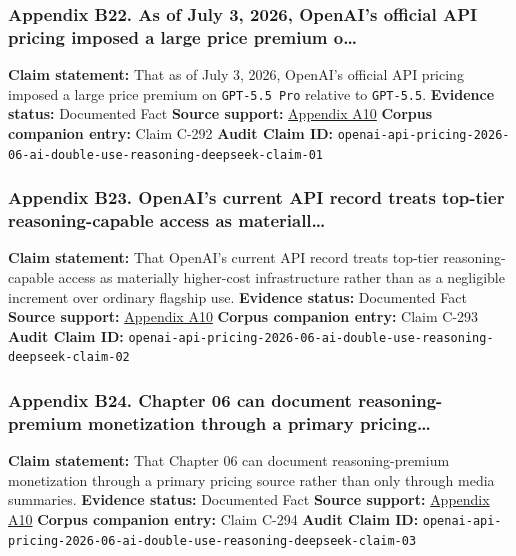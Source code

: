 \documentclass[
  american,
  11pt,
  letterpaper,
]{article}
\begin{document}
\subsubsection{Appendix B22. As of July 3, 2026, OpenAI's official API
pricing imposed a large price premium
o\ldots{}}\label{appendix-b22-as-of-july-3-2026-openai-s-official-api-pricing-imposed-a-large-price-premium-o}

\textbf{Claim statement:} That as of July 3, 2026, OpenAI's official API
pricing imposed a large price premium on \texttt{GPT-5.5\ Pro} relative
to \texttt{GPT-5.5}. \textbf{Evidence status:} Documented Fact
\textbf{Source support:}
\hyperref[appendix-a10-pricing-openai-api]{Appendix A10} \textbf{Corpus
companion entry:} Claim C-292 \textbf{Audit Claim ID:}
\texttt{openai-api-pricing-2026-06-ai-double-use-reasoning-deepseek-claim-01}

\subsubsection{Appendix B23. OpenAI's current API record treats top-tier
reasoning-capable access as
materiall\ldots{}}\label{appendix-b23-openai-s-current-api-record-treats-top-tier-reasoning-capable-access-as-materiall}

\textbf{Claim statement:} That OpenAI's current API record treats
top-tier reasoning-capable access as materially higher-cost
infrastructure rather than as a negligible increment over ordinary
flagship use. \textbf{Evidence status:} Documented Fact \textbf{Source
support:} \hyperref[appendix-a10-pricing-openai-api]{Appendix A10}
\textbf{Corpus companion entry:} Claim C-293 \textbf{Audit Claim ID:}
\texttt{openai-api-pricing-2026-06-ai-double-use-reasoning-deepseek-claim-02}

\subsubsection{Appendix B24. Chapter 06 can document reasoning-premium
monetization through a primary
pricing\ldots{}}\label{appendix-b24-chapter-06-can-document-reasoning-premium-monetization-through-a-primary-pricing}

\textbf{Claim statement:} That Chapter 06 can document reasoning-premium
monetization through a primary pricing source rather than only through
media summaries. \textbf{Evidence status:} Documented Fact
\textbf{Source support:}
\hyperref[appendix-a10-pricing-openai-api]{Appendix A10} \textbf{Corpus
companion entry:} Claim C-294 \textbf{Audit Claim ID:}
\texttt{openai-api-pricing-2026-06-ai-double-use-reasoning-deepseek-claim-03}
\end{document}
